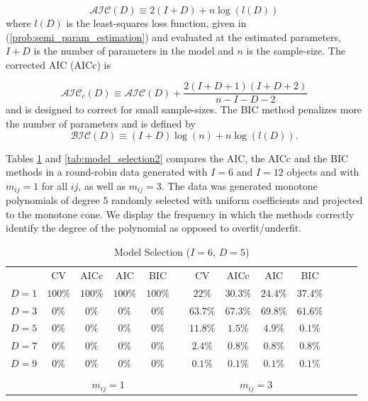 \documentclass[twoside,11pt]{article}
\begin{document}
\begin{equation}
\label{eq:AIC}
\mathcal{AIC}(D) \equiv 2(I+D)+n\log(l(D))
\end{equation}
where $l(D)$ is the least-squares loss function, given in   (\ref{prob:semi_param_estimation}) and evaluated at  the estimated parameters, $I+D$ is the number of parameters in the model and $n$ is the sample-size. The corrected AIC (AICc) is 

\begin{equation}
\label{eq:AICc}
\mathcal{AIC}_c(D) \equiv \mathcal{AIC}(D) + \frac{2(I+D+1)(I+D+2)}{n-I-D-2}
\end{equation}
and is designed to correct for small sample-sizes. The BIC method penalizes more the number of parameters and is defined by
\begin{equation}
\label{eq:BIC}
\mathcal{BIC}(D) \equiv (I+D)\log(n)+n\log(l(D)).
\end{equation}

Tables \ref{tab:model_selection} and \ref{tab:model_selection2} compares the AIC, the AICc and the BIC methods in a round-robin data generated with $I=6$ and $I = 12$ objects and with $m_{ij} = 1$ for all $ij$, as well as $m_{ij} = 3$.  The data was generated  monotone polynomials of degree $5$ randomly selected with uniform coefficients and projected to the monotone cone. We display the frequency in which the methods correctly identify the degree of the polynomial as opposed to overfit/underfit.

\begin{table}[]
\centering
\begin{tabular}{ccccccccccccc}
        & CV & AICc    & AIC     & BIC   & & CV & AICc     & AIC       & BIC \\
$D = 1$ &       $100\%$    & $100\%$ & $100\%$ & $100\%$& &     $22\%$      & $30.3\%$ & $24.4\%$  & $37.4\%$\\
$D = 3$ &       $0\%$      & $0\%$   & $0\%$   & $0\%$  & &     $63.7\%$    & $67.3\%$  & $69.8\%$ &$61.6\%$\\
$D = 5$ &       $0\%$      & $0\%$   & $0\%$   & $0\%$  & &     $11.8\%$    & $1.5\%$    & $4.9\%$ & $0.1\%$\\
$D = 7$ &       $0\%$      & $0\%$   & $0\%$   & $0\%$  & &     $2.4\%$      & $0.8\%$  & $0.8\%$ & $0.8\%$ \\
$D = 9$ &       $0\%$      & $0\%$   & $0\%$   & $0\%$  & &     $0.1\%$      & $0.1\%$ & $0.1\%$  & $0.1\%$     \\  \cmidrule{2-5}  \cmidrule{7-10} \\ & \multicolumn{4}{c}{$m_{ij}= 1$}  & & \multicolumn{4}{c}{$m_{ij}= 3$}
\end{tabular} 
\caption{Model Selection ($I = 6$, $D = 5$)}
\label{tab:model_selection}
\end{table}
\end{document}
